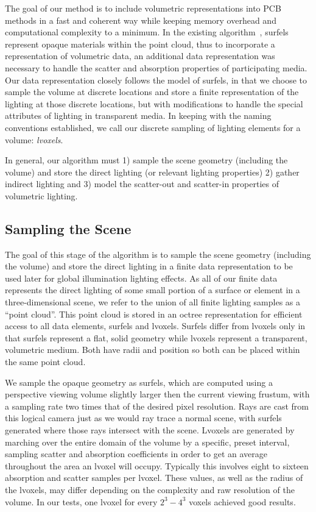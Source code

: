 \documentclass[runningheads]{llncs}
\begin{document}
The goal of our method is to include volumetric representations into PCB methods in a fast and coherent way while keeping memory overhead and computational complexity to a minimum.  In the existing algorithm~\cite{christensen:2008}, surfels represent opaque materials within the point cloud, thus to incorporate a representation of volumetric data, an additional data representation was necessary to handle the scatter and absorption properties of participating media.  Our data representation closely follows the model of surfels, in that we choose to sample the volume at discrete locations and store a finite representation of the lighting at those discrete locations, but with modifications to handle the special attributes of lighting in transparent media.  In keeping with the naming conventions established, we call our discrete sampling of lighting elements for a volume: \emph{lvoxels}.  

In general, our algorithm must 1) sample the scene geometry (including the volume) and store the direct lighting (or relevant lighting properties) 2) gather indirect lighting and 3) model the scatter-out and scatter-in properties of volumetric lighting.

\subsection{Sampling the Scene}
The goal of this stage of the algorithm is to sample the scene geometry (including the volume) and store the direct lighting in a finite data representation to be used later for global illumination lighting effects.  As all of our finite data represents the direct lighting of some small portion of a surface or element in a three-dimensional scene, we refer to the union of all finite lighting samples as a ``point cloud''.  This point cloud is stored in an octree representation for efficient access to all data elements, surfels and lvoxels.  Surfels differ from lvoxels only in that surfels represent a flat, solid geometry while lvoxels represent a transparent, volumetric medium.  Both have radii and position so both can be placed within the same point cloud.  

We sample the opaque geometry as surfels, which are computed using a perspective viewing volume slightly larger then the current viewing frustum, with a sampling rate two times that of the desired pixel resolution.  Rays are cast from this logical camera just as we would ray trace a normal scene, with surfels generated where those rays intersect with the scene.  Lvoxels are generated by marching over the entire domain of the volume by a specific, preset interval, sampling scatter and absorption coefficients in order to get an average throughout the area an lvoxel will occupy.  Typically this involves eight to sixteen absorption and scatter samples per lvoxel.  These values, as well as the radius of the lvoxels, may differ depending on the complexity and raw resolution of the volume.  In our tests, one lvoxel for every $2^3 - 4^3$ voxels achieved good results.
\end{document}
